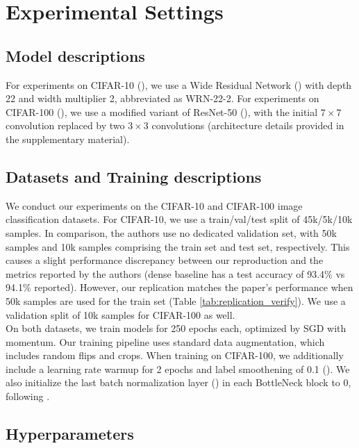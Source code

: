 \section{Experimental Settings}

\subsection{Model descriptions}

For experiments on CIFAR-10 (\citet{Krizhevsky09learningmultiple}), we use a Wide Residual Network (\citet{Wide_ResNet_BMVC2016_87}) with depth 22 and width multiplier 2, abbreviated as WRN-22-2. For experiments on CIFAR-100 (\citet{Krizhevsky09learningmultiple}), we use a modified variant of ResNet-50 (\citet{He_2016_CVPR}), with the initial $7\times 7$ convolution replaced by two $3 \times 3$ convolutions (architecture details provided in the supplementary material). 

\subsection{Datasets and Training descriptions}

We conduct our experiments on the CIFAR-10 and CIFAR-100 image classification datasets. For CIFAR-10, we use a train/val/test split of 45k/5k/10k samples. In comparison, the authors use no dedicated validation set, with 50k samples and 10k samples comprising the train set and test set, respectively. This causes a slight performance discrepancy between our reproduction and the metrics reported by the authors (dense baseline has a test accuracy of 93.4\% vs 94.1\% reported). However, our replication matches the paper's performance when 50k samples are used for the train set (Table \ref{tab:replication_verify}). We use a validation split of 10k samples for CIFAR-100 as well.\\



On both datasets, we train models for 250 epochs each, optimized by SGD with momentum.  Our training pipeline uses standard data augmentation, which includes random flips and crops. When training on CIFAR-100, we additionally include a learning rate warmup for 2 epochs and label smoothening of 0.1 (\citet{goyal2017accurate}). We also initialize the last batch normalization layer (\citet{ioffe2015batch}) in each BottleNeck block to 0, following \citet{He_2019_CVPR}.

\subsection{Hyperparameters}

